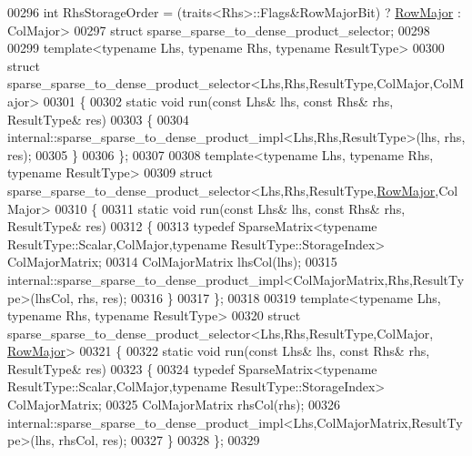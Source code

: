 \begin{DoxyCode}
00296   \textcolor{keywordtype}{int} RhsStorageOrder = (traits<Rhs>::Flags&RowMajorBit) ? \hyperlink{group__enums_ggaacded1a18ae58b0f554751f6cdf9eb13acfcde9cd8677c5f7caf6bd603666aae3}{RowMajor} : ColMajor>
00297 \textcolor{keyword}{struct }sparse\_sparse\_to\_dense\_product\_selector;
00298 
00299 \textcolor{keyword}{template}<\textcolor{keyword}{typename} Lhs, \textcolor{keyword}{typename} Rhs, \textcolor{keyword}{typename} ResultType>
00300 \textcolor{keyword}{struct }sparse\_sparse\_to\_dense\_product\_selector<Lhs,Rhs,ResultType,ColMajor,ColMajor>
00301 \{
00302   \textcolor{keyword}{static} \textcolor{keywordtype}{void} run(\textcolor{keyword}{const} Lhs& lhs, \textcolor{keyword}{const} Rhs& rhs, ResultType& res)
00303   \{
00304     internal::sparse\_sparse\_to\_dense\_product\_impl<Lhs,Rhs,ResultType>(lhs, rhs, res);
00305   \}
00306 \};
00307 
00308 \textcolor{keyword}{template}<\textcolor{keyword}{typename} Lhs, \textcolor{keyword}{typename} Rhs, \textcolor{keyword}{typename} ResultType>
00309 \textcolor{keyword}{struct }sparse\_sparse\_to\_dense\_product\_selector<Lhs,Rhs,ResultType,\hyperlink{group__enums_ggaacded1a18ae58b0f554751f6cdf9eb13acfcde9cd8677c5f7caf6bd603666aae3}{RowMajor},ColMajor>
00310 \{
00311   \textcolor{keyword}{static} \textcolor{keywordtype}{void} run(\textcolor{keyword}{const} Lhs& lhs, \textcolor{keyword}{const} Rhs& rhs, ResultType& res)
00312   \{
00313     \textcolor{keyword}{typedef} SparseMatrix<typename ResultType::Scalar,ColMajor,typename ResultType::StorageIndex> 
      ColMajorMatrix;
00314     ColMajorMatrix lhsCol(lhs);
00315     internal::sparse\_sparse\_to\_dense\_product\_impl<ColMajorMatrix,Rhs,ResultType>(lhsCol, rhs, res);
00316   \}
00317 \};
00318 
00319 \textcolor{keyword}{template}<\textcolor{keyword}{typename} Lhs, \textcolor{keyword}{typename} Rhs, \textcolor{keyword}{typename} ResultType>
00320 \textcolor{keyword}{struct }sparse\_sparse\_to\_dense\_product\_selector<Lhs,Rhs,ResultType,ColMajor,
      \hyperlink{group__enums_ggaacded1a18ae58b0f554751f6cdf9eb13acfcde9cd8677c5f7caf6bd603666aae3}{RowMajor}>
00321 \{
00322   \textcolor{keyword}{static} \textcolor{keywordtype}{void} run(\textcolor{keyword}{const} Lhs& lhs, \textcolor{keyword}{const} Rhs& rhs, ResultType& res)
00323   \{
00324     \textcolor{keyword}{typedef} SparseMatrix<typename ResultType::Scalar,ColMajor,typename ResultType::StorageIndex> 
      ColMajorMatrix;
00325     ColMajorMatrix rhsCol(rhs);
00326     internal::sparse\_sparse\_to\_dense\_product\_impl<Lhs,ColMajorMatrix,ResultType>(lhs, rhsCol, res);
00327   \}
00328 \};
00329 

\end{DoxyCode}
